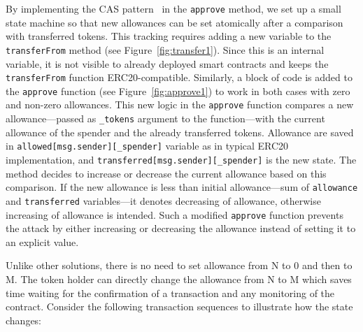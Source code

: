 By implementing the CAS pattern~\cite{Ref06} in the \texttt{approve} method, we set up a small state machine so that new allowances can be set atomically after a comparison with transferred tokens. This tracking requires adding a new variable to the \texttt{transferFrom} method (see Figure~\ref{fig:transfer1}). Since this is an internal variable, it is not visible to already deployed smart contracts and keeps the \texttt{transferFrom} function ERC20-compatible. Similarly, a block of code is added to the \texttt{approve} function (see Figure~\ref{fig:approve1}) to work in both cases with zero and non-zero allowances. This new logic in the \texttt{approve} function compares a new allowance---passed as \texttt{\_tokens} argument to the function---with the current allowance of the spender and the already transferred tokens. Allowance are saved in \texttt{allowed[msg.sender][\_spender]} variable as in typical ERC20 implementation, and \texttt{transferred[msg.sender][\_spender]} is the new state. The method decides to increase or decrease the current allowance based on this comparison. If the new allowance is less than initial allowance---sum of \texttt{allowance} and \texttt{transferred} variables---it denotes decreasing of allowance, otherwise increasing of allowance is intended. Such a modified \texttt{approve} function prevents the attack by either increasing or decreasing the allowance instead of setting it to an explicit value.

Unlike other solutions, there is no need to set allowance from N to 0 and then to M. The token holder can directly change the allowance from N to M which saves time waiting for the confirmation of a transaction and any monitoring of the contract. Consider the following transaction sequences to illustrate how the state changes:


